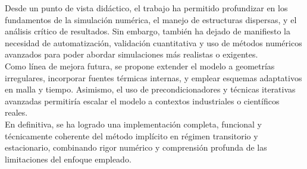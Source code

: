 \documentclass{article}
\begin{document}
Desde un punto de vista didáctico, el trabajo ha permitido profundizar en los fundamentos de la simulación numérica, el manejo de estructuras dispersas, y el análisis crítico de resultados. Sin embargo, también ha dejado de manifiesto la necesidad de automatización, validación cuantitativa y uso de métodos numéricos avanzados para poder abordar simulaciones más realistas o exigentes.\\

Como línea de mejora futura, se propone extender el modelo a geometrías irregulares, incorporar fuentes térmicas internas, y emplear esquemas adaptativos en malla y tiempo. Asimismo, el uso de precondicionadores y técnicas iterativas avanzadas permitiría escalar el modelo a contextos industriales o científicos reales.\\

En definitiva, se ha logrado una implementación completa, funcional y técnicamente coherente del método implícito en régimen transitorio y estacionario, combinando rigor numérico y comprensión profunda de las limitaciones del enfoque empleado.


\newpage
\end{document}
